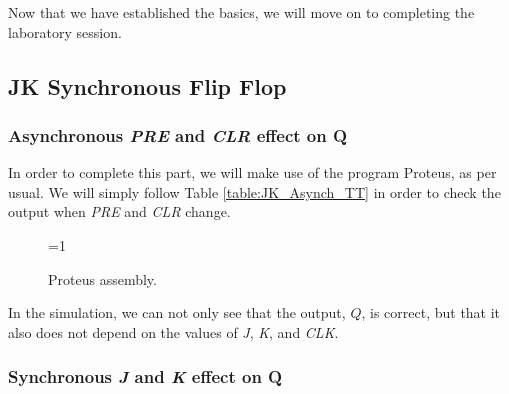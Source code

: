 \documentclass[a4paper, 11pt, oneside]{article}
\begin{document}
\newpage

Now that we have established the basics, we will move on to completing the laboratory session.

\subsection{JK Synchronous Flip Flop}

\subsubsection{Asynchronous \textit{PRE} and \textit{CLR} effect on Q}

In order to complete this part, we will make use of the program Proteus, as per usual. We will simply follow Table \ref{table:JK_Asynch_TT} in order to check the output when \textit{PRE} and \textit{CLR} change.

\begin{figure}[H]
    \centering
    
    \ifnum\value{ANIMATION}=1 {
    } 
    \fi
    
    \caption{Proteus assembly.}
    \label{fig:PROTEUS_JK_ASYNCH}
\end{figure}

In the simulation, we can not only see that the output, $Q$, is correct, but that it also does not depend on the values of \textit{J}, \textit{K}, and \textit{CLK}. 

\subsubsection{Synchronous \textit{J} and \textit{K} effect on Q}
\end{document}
